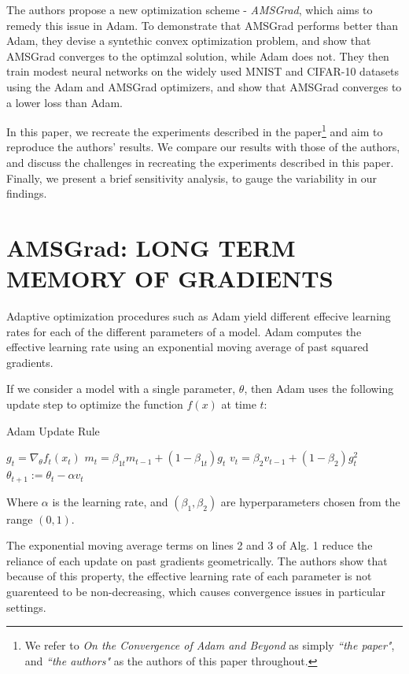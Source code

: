 \documentclass[letterpaper, 10 pt, conference]{ieeeconf}  %
\begin{document}
The authors propose a new optimization scheme - \emph{AMSGrad}, which aims to remedy this issue in Adam. To demonstrate that AMSGrad performs better than Adam, they devise a syntethic convex optimization problem, and show that AMSGrad converges to the optimzal solution, while Adam does not. They then train modest neural networks on the widely used MNIST and CIFAR-10 datasets using the Adam and AMSGrad optimizers, and show that AMSGrad converges to a lower loss than Adam. 

In this paper, we recreate the experiments described in the paper\footnote{We refer to \emph{On the Convergence of Adam and Beyond} as simply \emph{``the paper"}, and \emph{``the authors"} as the authors of this paper throughout.} and aim to reproduce the authors' results. We compare our results with those of the authors, and discuss the challenges in recreating the experiments described in this paper. Finally, we present a brief sensitivity analysis, to gauge the variability in our findings.

\section{AMSGrad: LONG TERM MEMORY OF GRADIENTS}

Adaptive optimization procedures such as Adam yield different effecive learning rates for each of the different parameters of a model. Adam computes the effective learning rate using an exponential moving average of past squared gradients. 

If we consider a model with a single parameter, $\theta$, then Adam uses the following update step to optimize the function $f(x)$ at time $t$:

\begin{algorithm}
\caption{Adam Update Rule}\label{Adam-update}
\begin{algorithmic}[1]
\State $g_t = \nabla_{\theta}f_t(x_t)$
\State $m_t = \beta_{1t}m_{t-1} + (1 - \beta_{1t})g_t$ 
\State $v_t = \beta_2{v_{t-1}} + (1-\beta_2)g_t^2$
\State $\theta_{t + 1} := \theta_t - \alpha{v_t}$
\end{algorithmic}
\end{algorithm}
Where $\alpha$ is the learning rate, and $(\beta_1, \beta_2)$ are hyperparameters chosen from the range $(0,1)$.

The exponential moving average terms on lines 2 and 3 of Alg. 1 reduce the reliance of each update on past gradients geometrically. The authors show that because of this property, the effective learning rate of each parameter is not guarenteed to be non-decreasing, which causes convergence issues in particular settings. 
\end{document}

